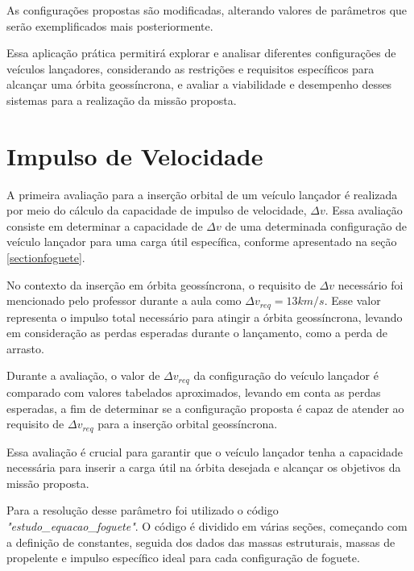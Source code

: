 As configurações propostas são modificadas, alterando valores de parâmetros que serão exemplificados mais posteriormente.


Essa aplicação prática permitirá explorar e analisar diferentes configurações de veículos lançadores, considerando as restrições e requisitos específicos para alcançar uma órbita geossíncrona, e avaliar a viabilidade e desempenho desses sistemas para a realização da missão proposta.



\section{Impulso de Velocidade}

A primeira avaliação para a inserção orbital de um veículo lançador é realizada por meio do cálculo da capacidade de impulso de velocidade, $\Delta v$. Essa avaliação consiste em determinar a capacidade de $\Delta v$ de uma determinada configuração de veículo lançador para uma carga útil específica, conforme apresentado na seção \ref{sectionfoguete}.

No contexto da inserção em órbita geossíncrona, o requisito de $\Delta v$ necessário foi mencionado pelo professor durante a aula como $\Delta v_{req} = 13 km/s$. Esse valor representa o impulso total necessário para atingir a órbita geossíncrona, levando em consideração as perdas esperadas durante o lançamento, como a perda de arrasto.

Durante a avaliação, o valor de $\Delta v_{req}$ da configuração do veículo lançador é comparado com valores tabelados aproximados, levando em conta as perdas esperadas, a fim de determinar se a configuração proposta é capaz de atender ao requisito de $\Delta v_{req}$ para a inserção orbital geossíncrona.

Essa avaliação é crucial para garantir que o veículo lançador tenha a capacidade necessária para inserir a carga útil na órbita desejada e alcançar os objetivos da missão proposta.

Para a resolução desse parâmetro foi utilizado o código \textit{"estudo\_equacao\_foguete"}. O código é dividido em várias seções, começando com a definição de constantes, seguida dos dados das massas estruturais, massas de propelente e impulso específico ideal para cada configuração de foguete.

